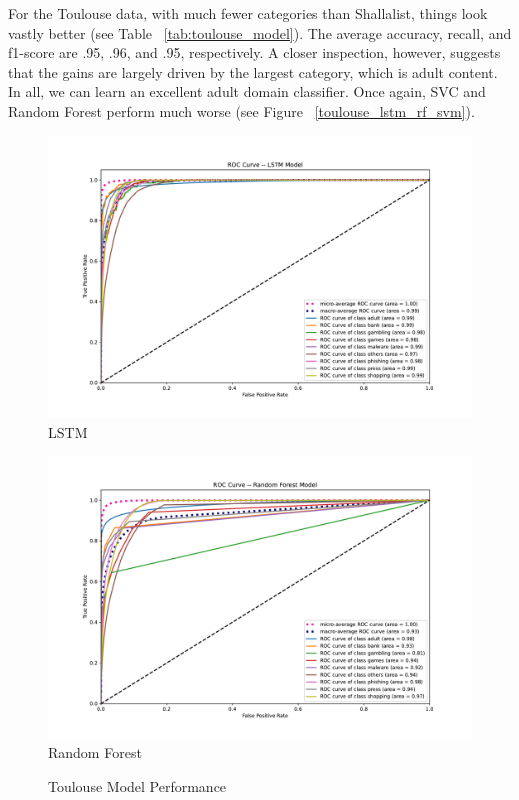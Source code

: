 \documentclass[12pt, letterpaper]{article}
\begin{document}
For the Toulouse data, with much fewer categories than Shallalist, things look vastly better (see Table ~\ref{tab:toulouse_model}). The average accuracy, recall, and f1-score are .95, .96, and .95, respectively. A closer inspection, however, suggests that the gains are largely driven by the largest category, which is adult content. In all, we can learn an excellent adult domain classifier. Once again, SVC and Random Forest perform much worse (see Figure ~\ref{toulouse_lstm_rf_svm}).

\begin{figure}[!htb]
\centering
\caption{Toulouse Model Performance}\label{toulouse_lstm_rf_svm}
	\begin{minipage}[b]{0.3\textwidth}
	\centering
	\label{toulouse_lstm}
	\includegraphics[width=\textwidth]{figs/roc-toulouse-2017-lstm.pdf}\\LSTM
	\end{minipage}
	\begin{minipage}[b]{0.3\textwidth}
	\centering
	\label{toulouse_rf}
	\includegraphics[width=\textwidth]{figs/roc-toulouse-2017-rf.pdf}\\Random Forest

\end{minipage}
\end{figure}
\end{document}
